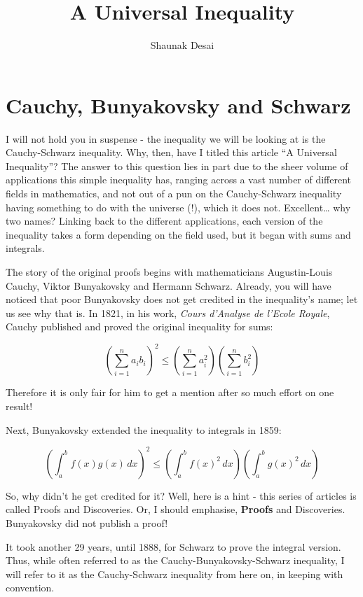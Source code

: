 \documentclass{article}
\title{A Universal Inequality}
\author{Shaunak Desai}
\date{}
\begin{document}
\maketitle

\section*{Cauchy, Bunyakovsky and Schwarz}

I will not hold you in suspense - the inequality we will be looking at is the Cauchy-Schwarz inequality. Why, then, have I titled this article “A Universal Inequality”? The answer to this question lies in part due to the sheer volume of applications this simple inequality has, ranging across a vast number of different fields in mathematics, and not out of a pun on the Cauchy-Schwarz inequality having something to do with the universe (!), which it does not. Excellent… why two names? Linking back to the different applications, each version of the inequality takes a form depending on the field used, but it began with sums and integrals.

The story of the original proofs begins with mathematicians Augustin-Louis Cauchy, Viktor Bunyakovsky and Hermann Schwarz. Already, you will have noticed that poor Bunyakovsky does not get credited in the inequality's name; let us see why that is. In 1821, in his work, \textit{Cours d'Analyse de l'Ecole Royale}, Cauchy published and proved the original inequality for sums:

\[
\left( \sum_{i=1}^n a_i b_i \right)^2 \leq \left( \sum_{i=1}^n a_i^2 \right) \left( \sum_{i=1}^n b_i^2 \right)
\]

Therefore it is only fair for him to get a mention after so much effort on one result!

Next, Bunyakovsky extended the inequality to integrals in 1859:

\[
\left( \int_a^b f(x)g(x)\,dx \right)^2 \leq \left( \int_a^b f(x)^2\,dx \right) \left( \int_a^b g(x)^2\,dx \right)
\]

So, why didn't he get credited for it? Well, here is a hint - this series of articles is called Proofs and Discoveries. Or, I should emphasise, \textbf{Proofs} and Discoveries. Bunyakovsky did not publish a proof!

It took another 29 years, until 1888, for Schwarz to prove the integral version. Thus, while often referred to as the Cauchy-Bunyakovsky-Schwarz inequality, I will refer to it as the Cauchy-Schwarz inequality from here on, in keeping with convention.
\end{document}
